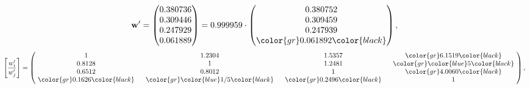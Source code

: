 \begin{example}
\begin{equation*}
\mathbf{w}^{\prime} =
\begin{pmatrix}
0.380736\\
0.309446\\
0.247929\\
0.061889
\end{pmatrix} =
0.999959\cdot
\begin{pmatrix}
0.380752\\
0.309459\\
0.247939\\
\color{gr} 0.061892\color{black}
\end{pmatrix},
\end{equation*}
\begin{equation*}
\left[ \frac{{w}^{\prime}_i}{{w}^{\prime}_j} \right] =
\begin{pmatrix}
$\,\,$ 1 $\,\,$ & $\,\,$1.2304$\,\,$ & $\,\,$1.5357$\,\,$ & $\,\,$\color{gr} 6.1519\color{black} $\,\,$ \\
$\,\,$0.8128$\,\,$ & $\,\,$ 1 $\,\,$ & $\,\,$1.2481$\,\,$ & $\,\,$\color{gr} \color{blue} 5\color{black}   $\,\,$ \\
$\,\,$0.6512$\,\,$ & $\,\,$0.8012$\,\,$ & $\,\,$ 1 $\,\,$ & $\,\,$\color{gr} 4.0060\color{black}  $\,\,$ \\
$\,\,$\color{gr} 0.1626\color{black} $\,\,$ & $\,\,$\color{gr} \color{blue}  1/5\color{black} $\,\,$ & $\,\,$\color{gr} 0.2496\color{black} $\,\,$ & $\,\,$ 1  $\,\,$ \\
\end{pmatrix},
\end{equation*}
\end{example}
\newpage
